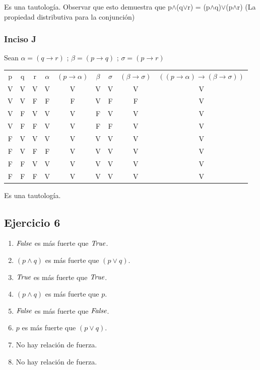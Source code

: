 	Es una tautología. Observar que esto demuestra que p$\wedge$(q$\vee$r) = (p$\wedge$q)$\vee$(p$\wedge$r) (La propiedad distributiva para la conjunción)
	
	\subsubsection{Inciso J}
	
	Sean $\alpha = (q\rightarrow r)$ ; $\beta = (p \rightarrow q)$ ; $\sigma = (p \rightarrow r)$
	
	\begin{tabular}{c|c|c|c|c|c|c|c|c}
		p & q & r & $\alpha$ & $(p \rightarrow \alpha)$ & $\beta$ & $\sigma$ & $(\beta \rightarrow \sigma)$ & $((p \rightarrow \alpha) \rightarrow (\beta \rightarrow \sigma))$\\
		V & V & V & V & V & V & V & V & V \\
		V & V & F & F & F & V & F & F & V \\
		V & F & V & V & V & F & V & V & V \\
		V & F & F & V & V & F & F & V & V \\
		F & V & V & V & V & V & V & V & V \\
		F & V & F & F & V & V & V & V & V \\
		F & F & V & V & V & V & V & V & V \\
		F & F & F & V & V & V & V & V & V
	\end{tabular}
	
	Es una tautología.
	
	\subsection{Ejercicio 6}
	\begin{enumerate}[label=(\alph*)]
		\item $\emph{False}$ es más fuerte que $\emph{True}$.
		\item $(p \wedge q)$ es más fuerte que $(p \vee q)$.
		\item $\emph{True}$ es más fuerte que $\emph{True}$.
		\item $(p \wedge q)$ es más fuerte que $p$.
		\item $\emph{False}$ es más fuerte que $\emph{False}$.
		\item $p$ es más fuerte que $(p\vee q)$.
		\item No hay relación de fuerza.
		\item No hay relación de fuerza.
	\end{enumerate}
	
